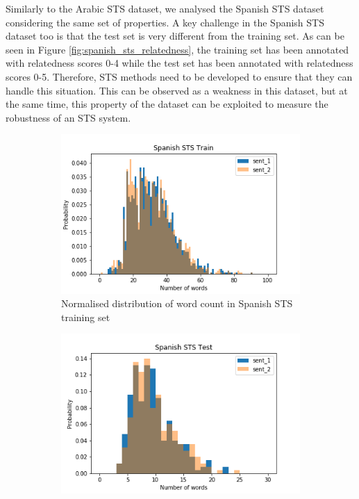 \begin{enumerate}
Similarly to the Arabic STS dataset, we analysed the Spanish STS dataset considering the same set of properties. A key challenge in the Spanish STS dataset too is that the test set is very different from the training set. As can be seen in Figure \ref{fig:spanish_sts_relatedness}, the training set has been annotated with relatedness scores 0-4 while the test set has been annotated with relatedness scores 0-5. Therefore, STS methods need to be developed to ensure that they can handle this situation. This can be observed as a weakness in this dataset, but at the same time, this property of the dataset can be exploited to measure the robustness of an STS system.

\begin{figure}
	\captionsetup[subfigure]{justification=centering}
	\centering
	\begin{subfigure}[b]{.5\textwidth}
		\centering
		\includegraphics[width=\textwidth]{figures/semantic_textual_similarity/introduction/spanish_sts_train_words.png}
		\caption{Normalised distribution of word count in Spanish STS training set}
		\label{fig:spanish_sts_train_words}
	\end{subfigure}%
	\begin{subfigure}[b]{.5\textwidth}
		\centering
		\includegraphics[width=\textwidth]{figures/semantic_textual_similarity/introduction/spanish_sts_test_words.png}

\end{subfigure}
\end{figure}
\end{enumerate}
